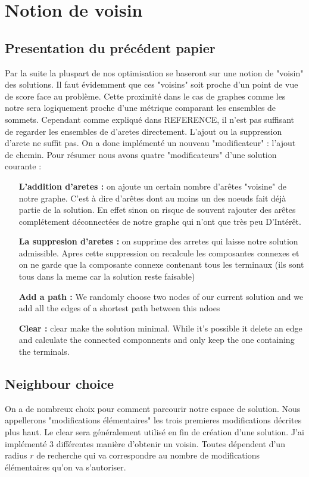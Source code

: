 \documentclass[10pt,a4paper]{article}
\begin{document}
\section{Notion de voisin}



\subsection{Presentation du précédent papier}
Par la suite la pluspart de nos optimisation se baseront sur une notion de "voisin" des solutions. Il faut évidemment que ces "voisins" soit proche d'un point de vue de score face au problème. Cette proximité dans le cas de graphes comme les notre sera logiquement proche d'une métrique comparant les ensembles de sommets. Cependant comme expliqué dans REFERENCE, il n'est pas suffisant de regarder les ensembles de d'aretes directement. L'ajout ou la suppression d'arete ne suffit pas. On a donc implémenté un nouveau "modificateur" : l'ajout de chemin. 
Pour résumer nous avons quatre "modificateurs" d'une solution courante :
\begin{itemize}   
\item[\textbf{L'addition  d'aretes : }] on ajoute un certain nombre d'arêtes "voisine" de notre graphe. C'est à dire d'arêtes dont au moins un des noeuds fait déjà partie de la solution. En effet sinon on risque de souvent rajouter des arêtes complétement déconnectées de notre graphe qui n'ont que très peu D’Intérêt.
\item[\textbf{La suppresion d'aretes : }] on supprime des arretes qui laisse notre solution admissible. Apres cette suppression on recalcule les composantes connexes et on ne garde que la composante connexe contenant tous les terminaux (ils sont tous dans la meme car la solution reste faisable)
\item[\textbf{Add a path : }] We randomly choose two nodes of our current solution and we add all the edges of a shortest path between this ndoes
\item[\textbf{Clear : }] clear make the solution minimal. While it's possible it delete an edge and calculate the connected componnents and only keep the one containing the terminals.
\end{itemize}

\subsection{Neighbour choice}

On a de nombreux choix pour comment parcourir notre espace de solution. Nous appellerons "modifications élémentaires" les trois premieres modifications décrites plus haut. Le clear sera généralement utilisé en fin de création d'une solution. J'ai implémenté 3 différentes manière d'obtenir un voisin. Toutes dépendent d'un radius $ r$ de recherche qui va correspondre au nombre de modifications élémentaires qu'on va s'autoriser. 
\end{document}
